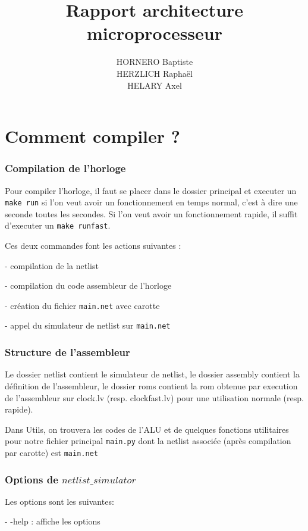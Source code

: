 \documentclass{article}
\title{Rapport architecture microprocesseur}
\author{HORNERO Baptiste \\ HERZLICH Raphaël \\ HELARY Axel}
\date{}
\begin{document}
\maketitle

\part*{Comment compiler ?}

\section*{Compilation de l'horloge}

Pour compiler l'horloge, il faut se placer dans le dossier principal et executer un \verb|make run| si l'on veut avoir un fonctionnement en temps normal, c'est à  dire une seconde toutes les secondes. Si l'on veut avoir un fonctionnement rapide, il suffit d'executer un \verb|make runfast|.

Ces deux commandes font les actions suivantes :

 - compilation de la netlist

 - compilation du code assembleur de l'horloge

 - création du fichier \verb|main.net| avec carotte

 - appel du simulateur de netlist sur \verb|main.net|

\section*{Structure de l'assembleur}

Le dossier netlist contient le simulateur de netlist, le dossier assembly contient la définition de l'assembleur, le dossier roms contient la rom obtenue par execution de l'assembleur sur clock.lv (resp. clockfast.lv) pour une utilisation normale (resp. rapide).

Dans Utils, on trouvera les codes de l'ALU et de quelques fonctions utilitaires pour notre fichier principal \verb|main.py| dont la netlist associée (après compilation par carotte) est \verb|main.net|

\section*{Options de $netlist\_simulator$}

Les options sont les suivantes:

- -help : affiche les options
\end{document}
